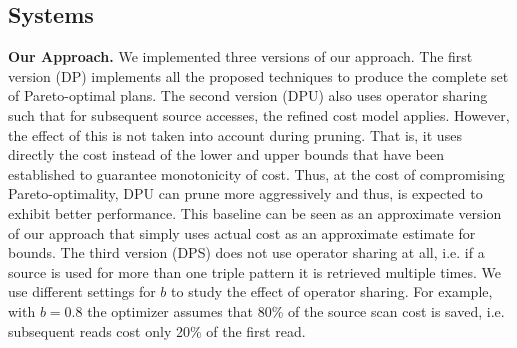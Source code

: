 









\subsection{Systems}
\textbf{Our Approach.} We implemented three versions of our
approach. The first version (DP) implements all the proposed
techniques to produce the complete set of Pareto-optimal plans. The
second version (DPU) also uses operator sharing such that for
subsequent source accesses, the refined cost model applies. However,
the effect of this is not taken into account during pruning.  That is,
it uses directly the cost instead of the lower and upper bounds that
have been established to guarantee monotonicity of cost. Thus, at the
cost of compromising Pareto-optimality, DPU can prune more
aggressively and thus, is expected to exhibit better performance. This baseline can be seen as an approximate version of our approach that simply uses actual cost as an approximate estimate for bounds. 
The third version (DPS) does not use
operator sharing at all, i.e. if a source is used for more than one
triple pattern it is retrieved multiple times. 
We use different settings for $b$ to study the effect of operator sharing. For example, with $b=0.8$ the optimizer assumes that 80\% of
the source scan cost is saved, i.e. subsequent reads cost only 20\% of the first read.


